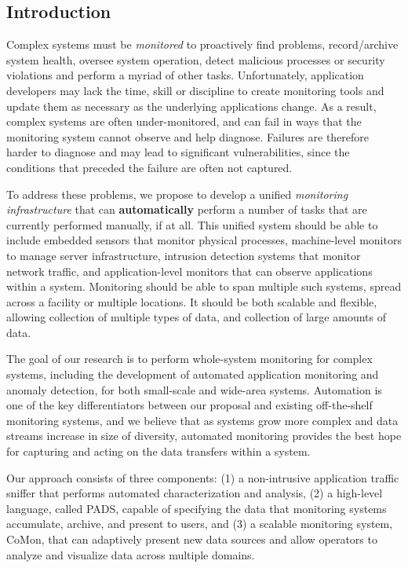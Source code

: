 \subsection{Introduction}
\label{ssec:intro}

Complex systems must be {\em monitored} to proactively find problems,
record/archive system health, oversee system operation, detect
malicious processes or security violations and perform a myriad of
other tasks.  Unfortunately, application developers may lack the time, skill
or discipline to create monitoring tools and update them as necessary
as the underlying applications change. As a result, complex systems
are often under-monitored, and can fail in ways that the monitoring
system cannot observe and help diagnose. Failures are therefore harder
to diagnose and may lead to significant vulnerabilities, since the 
conditions that preceded the failure are often not captured.

To address these problems, we propose to develop a unified {\em
monitoring infrastructure} that can {\bf automatically} perform a
number of tasks that are currently performed manually, if at all.
This unified system should be able to include embedded sensors that
monitor physical processes, machine-level monitors to manage server
infrastructure, intrusion detection systems that monitor network
traffic, and application-level monitors that can observe applications
within a system. Monitoring should be able to span multiple such
systems, spread across a facility or multiple locations. It should be
both scalable and flexible, allowing collection of multiple types of
data, and collection of large amounts of data.

The goal of our research is to perform whole-system monitoring for
complex systems, including the development of automated application
monitoring and anomaly detection, for both small-scale and wide-area
systems. Automation is one of the key differentiators between our
proposal and existing off-the-shelf monitoring systems, and we believe
that as systems grow more complex and data streams increase in size of
diversity, automated monitoring provides the best hope for capturing
and acting on the data transfers within a system.

Our approach consists of three components: (1) a non-intrusive
application traffic sniffer that performs automated characterization
and analysis, (2) a high-level language, called PADS, capable of
specifying the data that monitoring systems accumulate, archive, and
present to users, and (3) a scalable monitoring system, CoMon, that
can adaptively present new data sources and allow operators to analyze
and visualize data across multiple domains.

